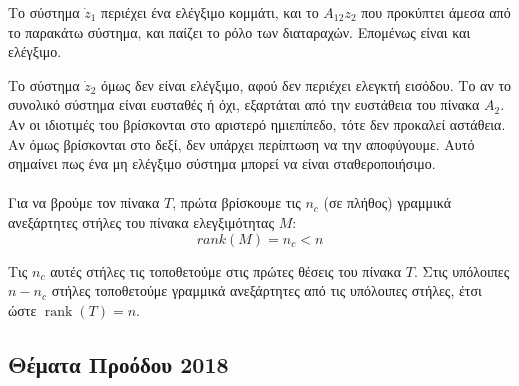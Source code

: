 \documentclass[11pt,a4paper,notitlepage,fleqn]{article}
\let\mytodo\todo
\renewcommand{\todo}[1]{\par\mytodo[inline,noline]{#1}}
\begin{document}
Το σύστημα \( \dot z_1 \) περιέχει ένα ελέγξιμο κομμάτι, και το \( A_{12}z_2 \) που προκύπτει άμεσα από το παρακάτω σύστημα, και παίζει το
ρόλο των διαταραχών. Επομένως είναι και ελέγξιμο.

Το σύστημα \( \dot z_2 \) όμως δεν είναι ελέγξιμο, αφού δεν περιέχει ελεγκτή εισόδου. Το αν το συνολικό σύστημα είναι ευσταθές ή όχι,
εξαρτάται από την ευστάθεια του πίνακα \( A_2 \). Αν οι ιδιοτιμές
του βρίσκονται στο αριστερό ημιεπίπεδο, τότε δεν προκαλεί αστάθεια. Αν όμως
βρίσκονται στο δεξί, δεν υπάρχει περίπτωση να την αποφύγουμε. Αυτό σημαίνει
πως ένα μη ελέγξιμο σύστημα μπορεί να είναι σταθεροποιήσιμο.

\paragraph{}
Για να βρούμε τον πίνακα \( T \), πρώτα βρίσκουμε τις \( n_c \) (σε πλήθος)
γραμμικά ανεξάρτητες στήλες του πίνακα ελεγξιμότητας \( M \):
\[
rank(M) = n_c < n
\]

Τις \( n_c \) αυτές στήλες τις τοποθετούμε στις πρώτες θέσεις του πίνακα
\( T \). Στις υπόλοιπες \( n-n_c \) στήλες τοποθετούμε γραμμικά ανεξάρτητες
από τις υπόλοιπες στήλες, έτσι ώστε \( \mathop{rank}(T) = n \).
\todo{Graph 31}

\subsection[Θέματα Προόδου 2018]{\color{green!50!black!90!blue!50!white}Θέματα Προόδου 2018}
\end{document}

